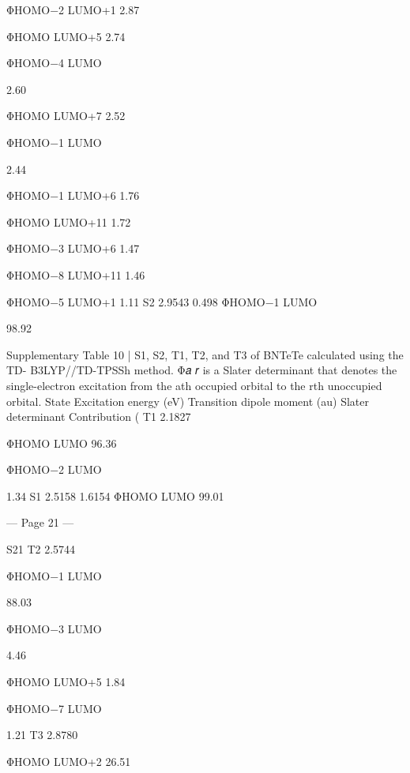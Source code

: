  
 
ΦHOMO−2
LUMO+1 
2.87 
 
 
 
ΦHOMO
LUMO+5 
2.74 
 
 
 
ΦHOMO−4
LUMO
 
2.60 
 
 
 
ΦHOMO
LUMO+7 
2.52 
 
 
 
ΦHOMO−1
LUMO
 
2.44 
 
 
 
ΦHOMO−1
LUMO+6 
1.76 
 
 
 
ΦHOMO
LUMO+11 
1.72 
 
 
 
ΦHOMO−3
LUMO+6 
1.47 
 
 
 
ΦHOMO−8
LUMO+11 
1.46 
 
 
 
ΦHOMO−5
LUMO+1 
1.11 
S2 
2.9543 
0.498 
ΦHOMO−1
LUMO
 
98.92 
 
 
Supplementary Table 10 | S1, S2, T1, T2, and T3 of BNTeTe calculated using the TD-
B3LYP//TD-TPSSh method. Φ𝑎
𝑟 is a Slater determinant that denotes the single-electron 
excitation from the ath occupied orbital to the rth unoccupied orbital. 
State 
Excitation 
energy (eV) 
Transition dipole  
moment (au) 
Slater 
determinant 
Contribution (%
T1 
2.1827 
 
ΦHOMO
LUMO       
96.36 
 
 
 
ΦHOMO−2
LUMO
 
1.34 
S1 
2.5158 
1.6154 
ΦHOMO
LUMO 
99.01 


--- Page 21 ---
 
S21 
T2 
2.5744 
 
ΦHOMO−1
LUMO
 
88.03 
 
 
 
ΦHOMO−3
LUMO
 
4.46 
 
 
 
ΦHOMO
LUMO+5 
1.84 
 
 
 
ΦHOMO−7
LUMO
 
1.21 
T3 
2.8780 
 
ΦHOMO
LUMO+2 
26.51 
 
 
 
